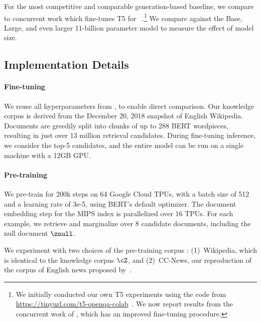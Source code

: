 
For the most competitive and comparable generation-based baseline, we compare to concurrent work which fine-tunes T5 for \openqa~\cite{t5_openqa}.\footnote{We initially conducted our own T5 experiments using the code from {\tiny\url{https://tinyurl.com/t5-openqa-colab}}~\cite{t5}. We now report results from the concurrent work of \citet{t5_openqa}, which has an improved fine-tuning procedure.}
We compare against the Base, Large, and even larger 11-billion parameter model to measure the effect of model size.



\subsection{Implementation Details}
\paragraph{Fine-tuning}
We reuse all hyperparameters from \citet{orqa}, to enable direct comparison. Our knowledge corpus is derived from the December 20, 2018 snapshot of English Wikipedia. Documents are greedily split into chunks of up to 288 BERT wordpieces, resulting in just over 13 million retrieval candidates. During fine-tuning inference, we consider the top-5 candidates, and the entire model can be run on a single machine with a 12GB GPU.

\paragraph{Pre-training}
We pre-train for 200k steps on 64 Google Cloud TPUs, with a batch size of 512 and a learning rate of 3e-5, using BERT's default optimizer. The document embedding step for the MIPS index is parallelized over 16 TPUs. For each example, we retrieve and marginalize over 8 candidate documents, including the null document $\znull$.

We experiment with two choices of the pre-training corpus \target:
(1)~Wikipedia, which is identical to the knowledge corpus $\cZ$, and (2)~CC-News, our reproduction of the corpus of English news proposed by~\citet{roberta}.

